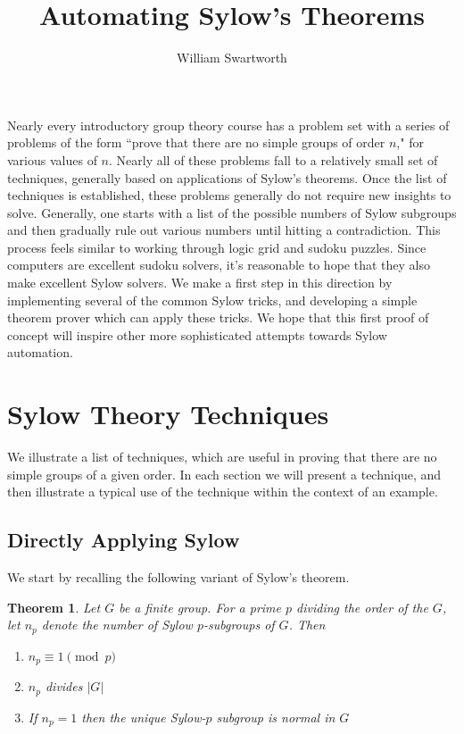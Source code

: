 \documentclass[11pt, oneside]{article}   	%
\title{Automating Sylow's Theorems}
\author{William Swartworth}
\newtheorem{theorem}{Theorem}
\begin{document}
\maketitle

Nearly every introductory group theory course has a problem set with a series of problems of the form ``prove that there are no simple groups of order $n$," for various values of $n$.  Nearly all of these problems fall to a relatively small set of techniques, generally based on applications of Sylow's theorems.  Once the list of techniques is established, these problems generally do not require new insights to solve.  Generally, one starts with a list of the possible numbers of Sylow subgroups and then gradually rule out various numbers until hitting a contradiction.  This process feels similar to working through logic grid and sudoku puzzles.  Since computers are excellent sudoku solvers, it's reasonable to hope that they also make excellent Sylow solvers.  We make a first step in this direction by implementing several of the common Sylow tricks, and developing a simple theorem prover which can apply these tricks.  We hope that this first proof of concept will inspire other more sophisticated attempts towards Sylow automation. 

\section{Sylow Theory Techniques}

We illustrate a list of techniques, which are useful in proving that there are no simple groups of a given order.  In each section we will present a technique, and then illustrate a typical use of the technique within the context of an example.

\subsection{Directly Applying Sylow}

We start by recalling the following variant of Sylow's theorem.

\begin{theorem}
Let $G$ be a finite group.  For a prime $p$ dividing the order of the $G$, let $n_p$ denote the number of Sylow $p$-subgroups of $G$. Then
\begin{enumerate}
\item $n_p \equiv 1 \pmod p$
\item $n_p$ divides $|G|$
\item If $n_p = 1$ then the unique Sylow-$p$ subgroup is normal in $G$ 
\end{enumerate}
\end{theorem}
\end{document}
